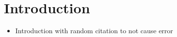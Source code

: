 \chapter{Introduction}
\begin{itemize}
    \item Introduction with random citation to not cause error~\cite{ACR*10}
\end{itemize}


